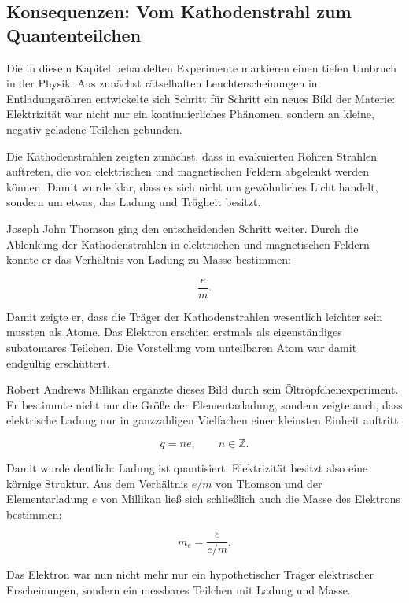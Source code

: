 \subsection{Konsequenzen: Vom Kathodenstrahl zum Quantenteilchen}
\label{subsec:konsequenzen-kathodenstrahl-thomson-millikan-photoeffekt}

Die in diesem Kapitel behandelten Experimente markieren einen tiefen
Umbruch in der Physik. Aus zunächst rätselhaften Leuchterscheinungen in
Entladungsröhren entwickelte sich Schritt für Schritt ein neues Bild der
Materie: Elektrizität war nicht nur ein kontinuierliches Phänomen, sondern
an kleine, negativ geladene Teilchen gebunden.

Die Kathodenstrahlen zeigten zunächst, dass in evakuierten Röhren Strahlen
auftreten, die von elektrischen und magnetischen Feldern abgelenkt werden
können. Damit wurde klar, dass es sich nicht um gewöhnliches Licht handelt,
sondern um etwas, das Ladung und Trägheit besitzt.

Joseph John Thomson ging den entscheidenden
Schritt weiter. Durch die Ablenkung der Kathodenstrahlen in elektrischen und
magnetischen Feldern konnte er das Verhältnis von Ladung zu Masse bestimmen:

\[
\frac{e}{m}.
\]

Damit zeigte er, dass die Träger der Kathodenstrahlen wesentlich leichter
sein mussten als Atome. Das Elektron erschien erstmals als
eigenständiges subatomares Teilchen. Die Vorstellung vom unteilbaren Atom
war damit endgültig erschüttert.

Robert Andrews Millikan ergänzte dieses Bild
durch sein Öltröpfchenexperiment. Er bestimmte
nicht nur die Größe der Elementarladung, sondern
zeigte auch, dass elektrische Ladung nur in ganzzahligen Vielfachen einer
kleinsten Einheit auftritt:

\[
q = n e,
\qquad n \in \mathbb{Z}.
\]

Damit wurde deutlich: Ladung ist quantisiert. Elektrizität besitzt also eine
körnige Struktur. Aus dem Verhältnis \(e/m\) von Thomson und der Elementarladung
\(e\) von Millikan ließ sich schließlich auch die Masse des Elektrons bestimmen:

\[
m_e = \frac{e}{e/m}.
\]

Das Elektron war nun nicht mehr nur ein hypothetischer Träger elektrischer
Erscheinungen, sondern ein messbares Teilchen mit Ladung und Masse.

